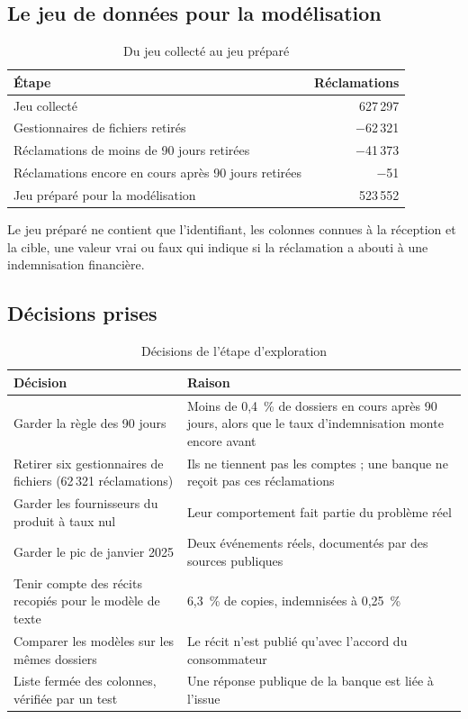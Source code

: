 \documentclass[11pt,a4paper]{article}
\begin{document}
\subsection{Le jeu de données pour la modélisation}

\begin{table}[H]
\centering\small
\begin{tabular}{@{}l r@{}}
\toprule
Étape & Réclamations \\
\midrule
Jeu collecté & 627\,297 \\
Gestionnaires de fichiers retirés & $-$62\,321 \\
Réclamations de moins de 90 jours retirées & $-$41\,373 \\
Réclamations encore en cours après 90 jours retirées & $-$51 \\
\midrule
Jeu préparé pour la modélisation & 523\,552 \\
\bottomrule
\end{tabular}
\caption{Du jeu collecté au jeu préparé}
\end{table}

Le jeu préparé ne contient que l'identifiant, les colonnes connues à la réception et la cible, une valeur vrai ou faux qui indique si la réclamation a abouti à une indemnisation financière.

\subsection{Décisions prises}

\begin{table}[H]
\centering\small
\begin{tabularx}{\linewidth}{@{}Y Y@{}}
\toprule
Décision & Raison \\
\midrule
Garder la règle des 90 jours & Moins de 0,4~\% de dossiers en cours après 90 jours, alors que le taux d'indemnisation monte encore avant \\
Retirer six gestionnaires de fichiers (62\,321 réclamations) & Ils ne tiennent pas les comptes ; une banque ne reçoit pas ces réclamations \\
Garder les fournisseurs du produit à taux nul & Leur comportement fait partie du problème réel \\
Garder le pic de janvier 2025 & Deux événements réels, documentés par des sources publiques \\
Tenir compte des récits recopiés pour le modèle de texte & 6,3~\% de copies, indemnisées à 0,25~\% \\
Comparer les modèles sur les mêmes dossiers & Le récit n'est publié qu'avec l'accord du consommateur \\
Liste fermée des colonnes, vérifiée par un test & Une réponse publique de la banque est liée à l'issue \\
\bottomrule
\end{tabularx}
\caption{Décisions de l'étape d'exploration}
\end{table}
\end{document}
